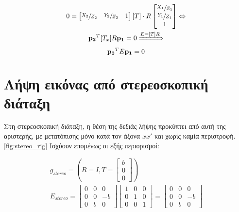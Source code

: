 \begin{equation}
\begin{gathered}
	0 = \begin{bmatrix} \sfrac{X_2}{Z_2} & \sfrac{Y_2}{Z_2} & 1 \end{bmatrix} [T] \cdot R
	\begin{bmatrix} \sfrac{X_1}{Z_1} \\ \sfrac{Y_1}{Z_1} \\ 1 \end{bmatrix}  \Leftrightarrow \\
	\mathbf{p_2}^{T} [T_x] R \mathbf{p_1} = 0 \xRightarrow{E=[T] R} \\
	\mathbf{p_2}^{T} E \mathbf{p_1} = 0
\end{gathered}
\end{equation}


\section{Λήψη εικόνας από στερεοσκοπική διάταξη}
\label{appendix:stereo_constraint_from_stereo_rig}

Στη στερεοσκοπική διάταξη, η θέση της δεξιάς λήψης προκύπτει από αυτή της αριστερής, με μετατόπισης μόνο κατά τον άξονα $xx'$ και χωρίς καμία περιστροφή. \ref{fig:stereo_rig} Ισχύουν επομένως οι εξής περιορισμοί: 

\begin{gather}
	g_{stereo} = \left( R=I,T = \begin{bmatrix}
		b \\ 0 \\ 0
	\end{bmatrix} \right)
	\\
	E_{stereo} = 
	\begin{bmatrix}
		0 & 0 & 0 \\ 0 & 0 & -b \\ 0 & b & 0
	\end{bmatrix}
	\begin{bmatrix}
		1 & 0 & 0 \\ 0 & 1 & 0 \\ 0 & 0 & 1
	\end{bmatrix} =
	\begin{bmatrix}
		0 & 0 & 0 \\ 0 & 0 & -b \\ 0 & b & 0
	\end{bmatrix}
\end{gather}


